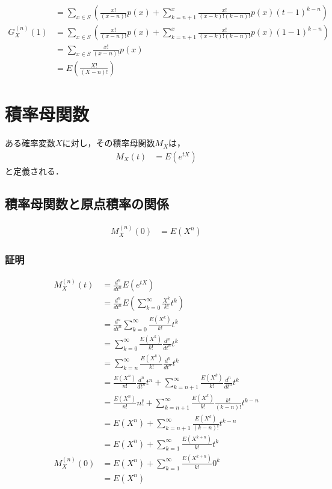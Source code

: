 \documentclass[dvipdfmx]{jsarticle}
\begin{document}
\begin{align}
  &=\sum_{x\in S}\left(\frac{x!}{\left(x-n\right)!}p\left(x\right)+\sum_{k=n+1}^x\frac{x!}{\left(x-k\right)!\left(k-n\right)!}p\left(x\right)\left(t-1\right)^{k-n}\right)\nonumber\\
  G_X^{\left(n\right)}\left(1\right)&=\sum_{x\in S}\left(\frac{x!}{\left(x-n\right)!}p\left(x\right)+\sum_{k=n+1}^x\frac{x!}{\left(x-k\right)!\left(k-n\right)!}p\left(x\right)\left(1-1\right)^{k-n}\right)\nonumber\\
  &=\sum_{x\in S}\frac{x!}{\left(x-n\right)!}p\left(x\right)\nonumber\\
  &=E\left(\frac{X!}{\left(X-n\right)!}\right)
 \end{align}
 \section{積率母関数}
ある確率変数$X$に対し，その積率母関数$M_X$は，
 \begin{align}
  M_X\left(t\right)&=E\left(e^{tX}\right)
 \end{align}
と定義される．
 \subsection{積率母関数と原点積率の関係}
 \begin{align}
  M_X^{\left(n\right)}\left(0\right)&=E\left(X^n\right)
 \end{align}
 \subsubsection{証明}
 \begin{align}
  M_X^{\left(n\right)}\left(t\right)&=\frac{d^n}{dt^n}E\left(e^{tX}\right)\nonumber\\
  &=\frac{d^n}{dt^n}E\left(\sum_{k=0}^\infty \frac{X^k}{k!}t^k\right)\nonumber\\
  &=\frac{d^n}{dt^n}\sum_{k=0}^\infty \frac{E\left(X^k\right)}{k!}t^k\nonumber\\
  &=\sum_{k=0}^\infty \frac{E\left(X^k\right)}{k!}\frac{d^n}{dt^n}t^k\nonumber\\
  &=\sum_{k=n}^\infty \frac{E\left(X^k\right)}{k!}\frac{d^n}{dt^n}t^k\nonumber\\
  &=\frac{E\left(X^n\right)}{n!}\frac{d^n}{dt^n}t^n+\sum_{k=n+1}^\infty \frac{E\left(X^k\right)}{k!}\frac{d^n}{dt^n}t^k\nonumber\\
  &=\frac{E\left(X^n\right)}{n!}n!+\sum_{k=n+1}^\infty \frac{E\left(X^k\right)}{k!}\frac{k!}{\left(k-n\right)!}t^{k-n}\nonumber\\
  &=E\left(X^n\right)+\sum_{k=n+1}^\infty \frac{E\left(X^k\right)}{\left(k-n\right)!}t^{k-n}\nonumber\\
  &=E\left(X^n\right)+\sum_{k=1}^\infty \frac{E\left(X^{k+n}\right)}{k!}t^k\nonumber\\
  M_X^{\left(n\right)}\left(0\right)&=E\left(X^n\right)+\sum_{k=1}^\infty \frac{E\left(X^{k+n}\right)}{k!}0^k\nonumber\\
  &=E\left(X^n\right)
 \end{align}
\end{document}
